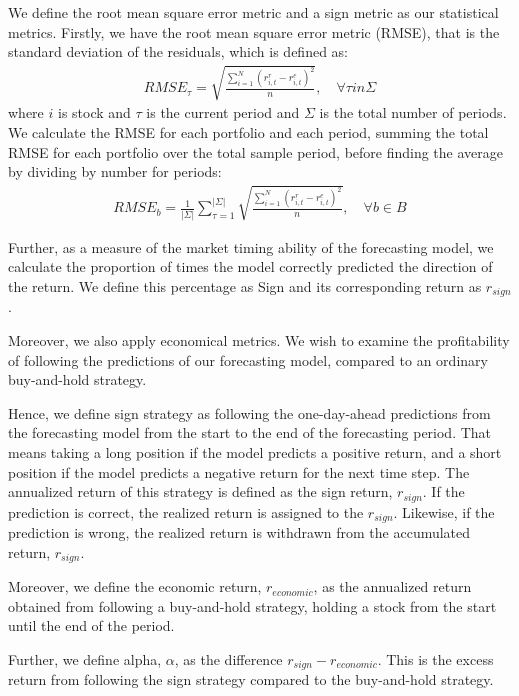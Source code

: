We define the root mean square error metric and a sign metric as our statistical metrics. Firstly, we have the root mean square error metric (RMSE), that is the standard deviation of the residuals, which is defined as:
\begin{align}
    RMSE_{\tau} = \sqrt{\frac{\sum_{i=1}^{N}(r_{i,t}^{r} - r_{i,t}^{e})^{2}}{n}}, \quad \forall \tau in \Sigma
\end{align}
where $i$ is stock and $\tau$ is the current period and $\Sigma$ is the total number of periods. We calculate the RMSE for each portfolio and each period, summing the total RMSE for each portfolio over the total sample period, before finding the average by dividing by number for periods:
\begin{align}
    RMSE_{b} = \frac{1}{|\Sigma|}\sum_{\tau=1}^{|\Sigma|}\sqrt{\frac{\sum_{i=1}^{N}(r_{i,t}^{r} - r_{i,t}^{e})^{2}}{n}}, \quad \forall b \in B
\end{align}

Further, as a measure of the market timing ability of the forecasting model, we calculate the proportion of times the model correctly predicted the direction of the return. We define this percentage as Sign and its corresponding return as $r_{sign}$. 

Moreover, we also apply economical metrics. We wish to examine the profitability of following the predictions of our forecasting model, compared to an ordinary buy-and-hold strategy. 

Hence, we define sign strategy as  following the one-day-ahead predictions from the forecasting model from the start to the end of the forecasting period. That means taking a long position if the model predicts a positive return, and a short position if the model predicts a negative return for the next time step. The annualized return of this strategy is defined as the sign return, $r_{sign}$.
If the prediction is correct, the realized return is assigned to the $r_{sign}$. Likewise, if the prediction is wrong, the realized return is withdrawn from the accumulated return, $r_{sign}$.

Moreover, we define the economic return, $r_{economic}$, as the annualized return obtained from following a buy-and-hold strategy, holding a stock from the start until the end of the period.

Further, we define alpha, $\alpha$, as the difference $r_{sign}-r_{economic}$. This is the excess return from following the sign strategy compared to the buy-and-hold strategy. 
